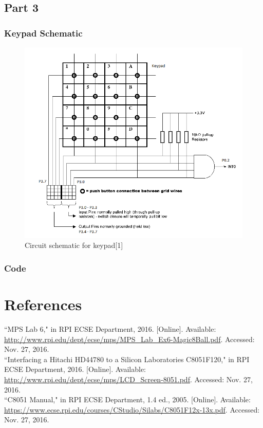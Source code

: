 \documentclass[12pt]{article}
\begin{document}
\subsection{Part 3}
\subsubsection{Keypad Schematic}
\begin{figure}[H]
	\centering
	\includegraphics[width=\textwidth]{keypad_schematic.png}
	\caption[]{Circuit schematic for keypad[1]}
	\label{KEY}
\end{figure}
\subsubsection{Code}
	

\section{References} 
\noindent
[1]``MPS Lab 6," in RPI ECSE Department, 2016. [Online]. Available: \url{http://www.rpi.edu/dept/ecse/mps/MPS_Lab_Ex6-Magic8Ball.pdf}. Accessed: Nov. 27, 2016.\\
\newline\noindent
[2]``Interfacing a Hitachi HD44780 to a Silicon Laboratories C8051F120," in RPI ECSE Department, 2016. [Online]. Available: \url{http://www.rpi.edu/dept/ecse/mps/LCD_Screen-8051.pdf}. Accessed: Nov. 27, 2016.\\
\newline\noindent
[3]``C8051 Manual," in RPI ECSE Department, 1.4 ed., 2005. [Online]. Available: \url{https://www.ecse.rpi.edu/courses/CStudio/Silabs/C8051F12x-13x.pdf}. Accessed: Nov. 27, 2016.
\end{document}
